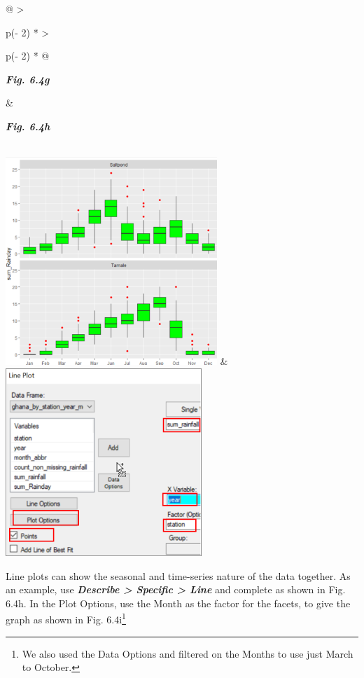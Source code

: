\documentclass[
  letterpaper,
  DIV=11,
  numbers=noendperiod]{scrreprt}
\begin{document}
\begin{longtable}[]{@{}
  >{\raggedright\arraybackslash}p{(\columnwidth - 2\tabcolsep) * }
  >{\raggedright\arraybackslash}p{(\columnwidth - 2\tabcolsep) * }@{}}
\toprule\noalign{}
\begin{minipage}[b]{\linewidth}\raggedright
\textbf{\emph{Fig. 6.4g}}
\end{minipage} & \begin{minipage}[b]{\linewidth}\raggedright
\textbf{\emph{Fig. 6.4h}}
\end{minipage} \\
\midrule\noalign{}
\endhead
\bottomrule\noalign{}
\endlastfoot
\includegraphics[width=3.14358in,height=3.09357in]{figures/Fig6.4g.png}
&
\includegraphics[width=2.91635in,height=2.79556in]{figures/Fig6.4h.png} \\
\end{longtable}

Line plots can show the seasonal and time-series nature of the data
together. As an example, use \textbf{\emph{Describe \textgreater{}
Specific \textgreater{} Line}} and complete as shown in Fig. 6.4h. In
the Plot Options, use the Month as the factor for the facets, to give
the graph as shown in Fig. 6.4i\footnote{We also used the Data Options
  and filtered on the Months to use just March to October.}
\end{document}
